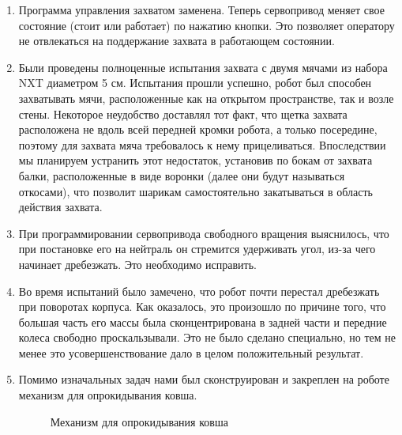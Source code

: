\begin{enumerate}
\begin{enumerate}
      \item Программа управления захватом заменена. Теперь сервопривод меняет свое состояние (стоит или работает) по нажатию кнопки. Это позволяет оператору не отвлекаться на поддержание захвата в работающем состоянии.
      
      \item Были проведены полноценные испытания захвата с двумя мячами из набора NXT диаметром 5 см. Испытания прошли успешно, робот был способен захватывать мячи, расположенные как на открытом пространстве, так и возле стены. Некоторое неудобство доставлял тот факт, что щетка захвата расположена не вдоль всей передней кромки робота, а только посередине, поэтому для захвата мяча требовалось к нему прицеливаться. Впоследствии мы планируем устранить этот недостаток, установив по бокам от захвата балки, расположенные в виде воронки (далее они будут называться откосами), что позволит шарикам самостоятельно закатываться в область действия захвата.
      
      \item При программировании сервопривода свободного вращения выяснилось, что при постановке его на нейтраль он стремится удерживать угол, из-за чего начинает дребезжать. Это необходимо исправить.
      
      \item Во время испытаний было замечено, что робот почти перестал дребезжать при поворотах корпуса. Как оказалось, это произошло по причине того, что большая часть его массы была сконцентрирована в задней части и передние колеса свободно проскальзывали. Это не было сделано специально, но тем не менее это усовершенствование дало в целом положительный результат.
      
      \item Помимо изначальных задач нами был сконструирован и закреплен на роботе механизм для опрокидывания ковша.
      
      \begin{figure}[H]
      	\begin{minipage}[h]{1\linewidth}
      		\caption{Механизм для опрокидывания ковша}
      	\end{minipage}
      \end{figure}
      

\end{enumerate}
\end{enumerate}
